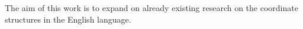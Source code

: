 The aim of this work is to expand on already existing research on the coordinate structures in the English language.